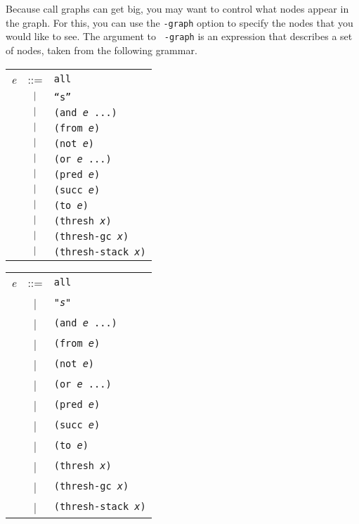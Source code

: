 Because call graphs can get big, you may want to control what nodes
appear in the graph.  For this, you can use the {\tt -graph} option to
specify the nodes that you would like to see.  The argument to {\tt
-graph} is an expression that describes a set of nodes, taken from the
following grammar.

\begin{latexonly}
\begin{center}
\begin{tabular}{lcl}
{\it e} & ::= & {\tt all} \\
& $\ |\ $ & {\tt ``{\it s}''} \\
& $\ |\ $ & {\tt (and {\it e} ...)} \\
& $\ |\ $ & {\tt (from {\it e})} \\
& $\ |\ $ & {\tt (not {\it e})} \\
& $\ |\ $ & {\tt (or {\it e} ...)} \\
& $\ |\ $ & {\tt (pred {\it e})} \\
& $\ |\ $ & {\tt (succ {\it e})} \\
& $\ |\ $ & {\tt (to {\it e})} \\
& $\ |\ $ & {\tt (thresh {\it x})} \\
& $\ |\ $ & {\tt (thresh-gc {\it x})} \\
& $\ |\ $ & {\tt (thresh-stack {\it x})} \\
\end{tabular}
\end{center}
\end{latexonly}
\begin{htmlonly}
\begin{center}
\begin{tabular}{lcl}
{\it e} & ::= & {\tt all} \\
& | & {\tt "{\it s}"} \\
& | & {\tt (and {\it e} ...)} \\
& | & {\tt (from {\it e})} \\
& | & {\tt (not {\it e})} \\
& | & {\tt (or {\it e} ...)} \\
& | & {\tt (pred {\it e})} \\
& | & {\tt (succ {\it e})} \\
& | & {\tt (to {\it e})} \\
& | & {\tt (thresh {\it x})} \\
& | & {\tt (thresh-gc {\it x})} \\
& | & {\tt (thresh-stack {\it x})} \\
\end{tabular}
\end{center}
\end{htmlonly}

